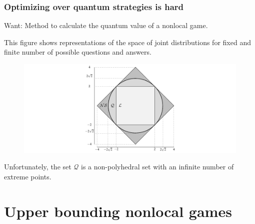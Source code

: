 \documentclass{beamer}
\def\Q{\mathcal{Q}}
\begin{document}
\begin{frame}
	\frametitle{Optimizing over quantum strategies is hard}
	\begin{center}
		{Want: Method to calculate the quantum value of a nonlocal game.}
	\end{center}	
	\vspace{2mm}
	This figure shows representations of the space of joint distributions for fixed and finite number of possible questions and answers.
	\begin{figure}[!htpb] \label{fig:extended-nonlocal-game}
	\begin{center}
		\includegraphics[scale=0.65]{figures/chsh_polytope.pdf}
	\end{center}
\end{figure}	
	Unfortunately, the set $\Q$ is a non-polyhedral set with an infinite number of extreme points. 
\end{frame}

  \section{Upper bounding nonlocal games}
\end{document}
